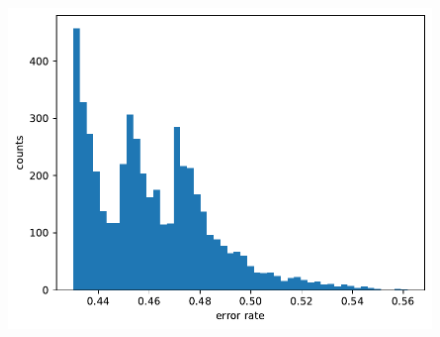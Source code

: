 \documentclass[11pt]{article}
\begin{document}
\begin{figure}
    \centering
    \includegraphics{images/2ferror.pdf}
\end{figure}

\newpage
\end{document}
